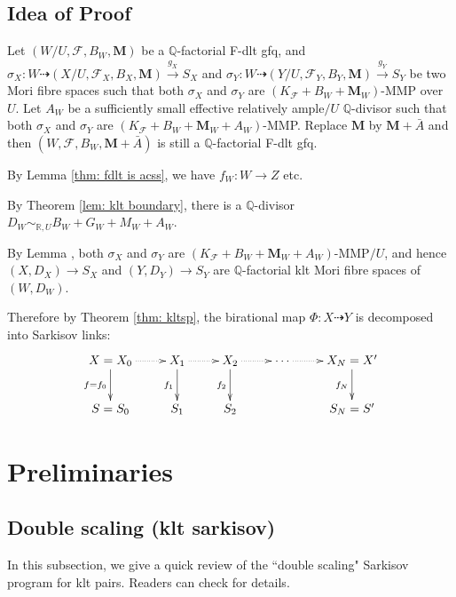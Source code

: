 \documentclass[11pt]{amsart}
\newcommand\wanginline[1]{\todo[inline,color=yellow!40]{#1}} %
\numberwithin{equation}{section}
\theoremstyle{definition}
\theoremstyle{definition}
\theoremstyle{definition}
\begin{document}
\subsection{Idea of Proof}
Let $(W/U,\mathcal{F},B_{W},\mathbf{M})$ be a $\mathbb{Q}$-factorial F-dlt gfq, and $\sigma_{X}: W \dashrightarrow (X/U,\mathcal{F}_{X},B_{X},\mathbf{M})\xrightarrow{g_{X}} S_{X}$  and  $\sigma_{Y}: W \dashrightarrow (Y/U,\mathcal{F}_{Y},B_{Y},\mathbf{M})\xrightarrow{g_{Y}}S_{Y} $ be two Mori fibre spaces such that  both $\sigma_{X}$ and $\sigma_{Y}$ are $(K_{\mathcal{F}}+B_{W}+\mathbf{M}_{W})$-MMP over $U$. Let $A_{W}$ be a sufficiently small effective relatively ample$/U$ $\mathbb{Q}$-divisor such that both $\sigma_{X}$ and $\sigma_{Y}$ are $(K_{\mathcal{F}}+B_{W}+\mathbf{M}_{W}+A_{W})$-MMP. Replace $\mathbf{M}$ by $\mathbf{M}+\bar{A}$ and then $(W,\mathcal{F},B_{W},\mathbf{M}+\bar{A})$ is still a $\mathbb{Q}$-factorial F-dlt gfq.  

By Lemma \ref{thm: fdlt is acss}, we have $f_{W}:W\to Z $ etc.

By Theorem \ref{lem: klt boundary}, there is a $\mathbb{Q}$-divisor $D_{W} \sim_{\mathbb{R},U}B_{W}+G_{W}+M_{W}+A_{W}$. 

By Lemma , both $\sigma_{X}$ and $\sigma_{Y}$ are $(K_{\mathcal{F}}+B_{W}+\mathbf{M}_{W}+A_{W})$-MMP$/U$, and hence $(X,D_{X})\to S_{X}$ and $(Y,D_{Y})\to S_{Y}$ are $\mathbb{Q}$-factorial klt Mori fibre spaces of $(W,D_{W})$. 

\wanginline{Gaps here: MMP over U or Z?}

Therefore by Theorem \ref{thm: kltsp}, the birational map $\Phi: X \dashrightarrow Y$ is decomposed into Sarkisov links:
  \[
    \xymatrix{
    X=X_0\ar@{.>}[r]\ar[d]_{f=f_{0}}&X_{1}\ar@{.>}[r]\ar[d]_{f_{1}}& X_{2}\ar[d]_{f_{2}}\ar@{.>}[r] &\cdots\ar@{.>}[r]&X_N=X'\ar[d]_{f_{N}} \\
    S=S_{0}&S_{1} &S_{2}&&S_N=S'
    }
  \]

\section{Preliminaries}


\subsection{Double scaling (klt sarkisov)}
In this subsection, we give a quick review of the ``double scaling" Sarkisov program for klt pairs. Readers can check \cite{haconMinimalModelProgram2012} for details.
\end{document}
